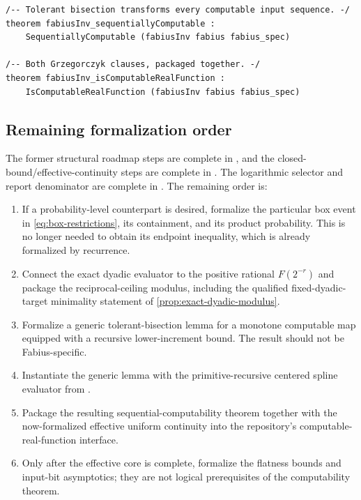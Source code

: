 \documentclass[11pt,oneside]{article}
\theoremstyle{definition}
\theoremstyle{remark}
\numberwithin{equation}{section}
\begin{document}
\begin{lstlisting}[style=reportpseudo,language={}]
/-- Tolerant bisection transforms every computable input sequence. -/
theorem fabiusInv_sequentiallyComputable :
    SequentiallyComputable (fabiusInv fabius fabius_spec)

/-- Both Grzegorczyk clauses, packaged together. -/
theorem fabiusInv_isComputableRealFunction :
    IsComputableRealFunction (fabiusInv fabius fabius_spec)
\end{lstlisting}

\subsection{Remaining formalization order}

The former structural roadmap steps are complete in
, and the closed-bound/effective-continuity steps are
complete in .  The logarithmic
selector and report denominator are complete in
.  The remaining order is:

\begin{enumerate}
\item If a probability-level counterpart is desired, formalize the particular
      box event in \eqref{eq:box-restrictions}, its containment, and its product
      probability.  This is no longer needed to obtain its endpoint
      inequality, which is already formalized by recurrence.
\item Connect the exact dyadic evaluator to the positive rational
      $F(2^{-r})$ and package the reciprocal-ceiling modulus, including the
      qualified fixed-dyadic-target minimality statement of
      \cref{prop:exact-dyadic-modulus}.
\item Formalize a generic tolerant-bisection lemma for a monotone computable
      map equipped with a recursive lower-increment bound.  The result should
      not be Fabius-specific.
\item Instantiate the generic lemma with the primitive-recursive centered
      spline evaluator from .
\item Package the resulting sequential-computability theorem together with
      the now-formalized effective uniform continuity into the repository's
      computable-real-function interface.
\item Only after the effective core is complete, formalize the flatness bounds
      and input-bit asymptotics; they are not logical prerequisites of the
      computability theorem.
\end{enumerate}
\end{document}
